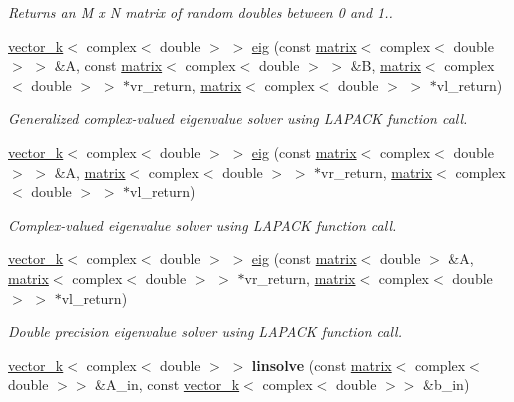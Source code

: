 \begin{DoxyCompactItemize}
\begin{DoxyCompactList}\small\item\em Returns an M x N matrix of random doubles between 0 and 1.. \end{DoxyCompactList}\item 
\hyperlink{classkeycpp_1_1vector__k}{vector\-\_\-k}$<$ complex$<$ double $>$ $>$ \hyperlink{namespacekeycpp_a35bb0a44bc7cc89e11e17598b12fb790}{eig} (const \hyperlink{classkeycpp_1_1matrix}{matrix}$<$ complex$<$ double $>$ $>$ \&A, const \hyperlink{classkeycpp_1_1matrix}{matrix}$<$ complex$<$ double $>$ $>$ \&B, \hyperlink{classkeycpp_1_1matrix}{matrix}$<$ complex$<$ double $>$ $>$ $\ast$vr\-\_\-return, \hyperlink{classkeycpp_1_1matrix}{matrix}$<$ complex$<$ double $>$ $>$ $\ast$vl\-\_\-return)
\begin{DoxyCompactList}\small\item\em Generalized complex-\/valued eigenvalue solver using L\-A\-P\-A\-C\-K function call. \end{DoxyCompactList}\item 
\hyperlink{classkeycpp_1_1vector__k}{vector\-\_\-k}$<$ complex$<$ double $>$ $>$ \hyperlink{namespacekeycpp_add8c0a1a89a17e871de965e9e0752cf3}{eig} (const \hyperlink{classkeycpp_1_1matrix}{matrix}$<$ complex$<$ double $>$ $>$ \&A, \hyperlink{classkeycpp_1_1matrix}{matrix}$<$ complex$<$ double $>$ $>$ $\ast$vr\-\_\-return, \hyperlink{classkeycpp_1_1matrix}{matrix}$<$ complex$<$ double $>$ $>$ $\ast$vl\-\_\-return)
\begin{DoxyCompactList}\small\item\em Complex-\/valued eigenvalue solver using L\-A\-P\-A\-C\-K function call. \end{DoxyCompactList}\item 
\hyperlink{classkeycpp_1_1vector__k}{vector\-\_\-k}$<$ complex$<$ double $>$ $>$ \hyperlink{namespacekeycpp_ae420202cfd39b4a62c508ac9efb64484}{eig} (const \hyperlink{classkeycpp_1_1matrix}{matrix}$<$ double $>$ \&A, \hyperlink{classkeycpp_1_1matrix}{matrix}$<$ complex$<$ double $>$ $>$ $\ast$vr\-\_\-return, \hyperlink{classkeycpp_1_1matrix}{matrix}$<$ complex$<$ double $>$ $>$ $\ast$vl\-\_\-return)
\begin{DoxyCompactList}\small\item\em Double precision eigenvalue solver using L\-A\-P\-A\-C\-K function call. \end{DoxyCompactList}\item 
\hypertarget{namespacekeycpp_a6471980b21aa921afce634693f9a0c6f}{\hyperlink{classkeycpp_1_1vector__k}{vector\-\_\-k}$<$ complex$<$ double $>$ $>$ {\bfseries linsolve} (const \hyperlink{classkeycpp_1_1matrix}{matrix}$<$ complex$<$ double $>$$>$ \&A\-\_\-in, const \hyperlink{classkeycpp_1_1vector__k}{vector\-\_\-k}$<$ complex$<$ double $>$$>$ \&b\-\_\-in)}\label{namespacekeycpp_a6471980b21aa921afce634693f9a0c6f}


\end{DoxyCompactItemize}
